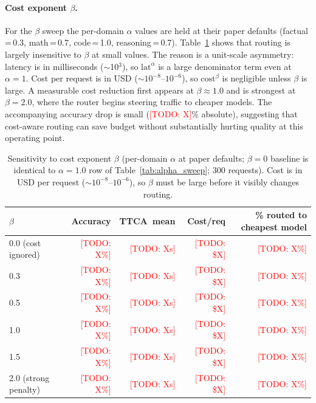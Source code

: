 \documentclass[11pt]{article}
\newcommand{\ttca}{\textsc{TTCA}\xspace}
\newcommand{\todo}[1]{\textcolor{red}{[TODO: #1]}}
\begin{document}
\paragraph{Cost exponent $\beta$.}
For the $\beta$ sweep the per-domain $\alpha$ values are held at their paper
defaults (factual\,=\,0.3, math\,=\,0.7, code\,=\,1.0, reasoning\,=\,0.7).
Table~\ref{tab:beta_sweep} shows that routing is largely insensitive to $\beta$
at small values.
The reason is a unit-scale asymmetry: latency is in milliseconds ($\sim$10$^{3}$),
so $\text{lat}^{\alpha}$ is a large denominator term even at $\alpha{=}1$.
Cost per request is in USD ($\sim$$10^{-8}$--$10^{-6}$), so $\text{cost}^{\beta}$
is negligible unless $\beta$ is large.
A measurable cost reduction first appears at $\beta{\approx}1.0$ and is strongest
at $\beta{=}2.0$, where the router begins steering traffic to cheaper models.
The accompanying accuracy drop is small (\todo{X}\% absolute), suggesting that
cost-aware routing can save budget without substantially hurting quality at this
operating point.

\begin{table}[t]
  \centering
  \caption{Sensitivity to cost exponent $\beta$
           (per-domain $\alpha$ at paper defaults; $\beta{=}0$ baseline is identical
           to $\alpha{=}1.0$ row of Table~\ref{tab:alpha_sweep}; 300 requests).
           Cost is in USD per request ($\sim$$10^{-8}$--$10^{-6}$),
           so $\beta$ must be large before it visibly changes routing.}
  \label{tab:beta_sweep}
  \small
  \begin{tabular}{lrrrr}
    \toprule
    $\beta$ & Accuracy & \ttca\ mean & Cost/req & \% routed to cheapest model \\
    \midrule
    0.0 (cost ignored)   & \todo{X\%} & \todo{Xs} & \todo{\$X} & \todo{X\%} \\
    0.3                  & \todo{X\%} & \todo{Xs} & \todo{\$X} & \todo{X\%} \\
    0.5                  & \todo{X\%} & \todo{Xs} & \todo{\$X} & \todo{X\%} \\
    1.0                  & \todo{X\%} & \todo{Xs} & \todo{\$X} & \todo{X\%} \\
    1.5                  & \todo{X\%} & \todo{Xs} & \todo{\$X} & \todo{X\%} \\
    2.0 (strong penalty) & \todo{X\%} & \todo{Xs} & \todo{\$X} & \todo{X\%} \\
    \bottomrule
  \end{tabular}
\end{table}
\end{document}
